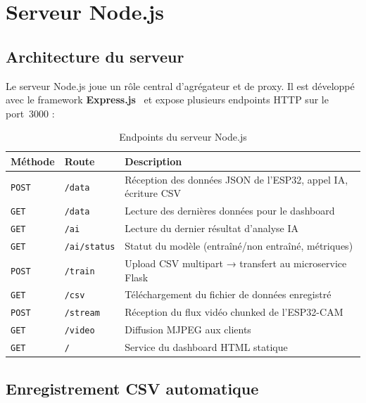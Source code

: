 \documentclass[12pt,a4paper]{report}
\newcommand{\code}[1]{\texttt{\small\colorbox{codebg}{#1}}}
\begin{document}
\chapter{Serveur Node.js}

\section{Architecture du serveur}

Le serveur Node.js joue un rôle central d'agrégateur et de proxy. Il est développé
avec le framework \textbf{Express.js}~\cite{nodejs_express} et expose plusieurs
endpoints HTTP sur le port~3000 :

\begin{table}[H]
\centering
\caption{Endpoints du serveur Node.js}
\label{tab:endpoints}
\begin{tabularx}{\textwidth}{@{}L{2cm}L{4cm}L{8cm}@{}}
\toprule
\textbf{Méthode} & \textbf{Route} & \textbf{Description} \\
\midrule
\code{POST} & \code{/data}      & Réception des données JSON de l'ESP32, appel IA, écriture CSV \\
\code{GET}  & \code{/data}      & Lecture des dernières données pour le dashboard \\
\code{GET}  & \code{/ai}        & Lecture du dernier résultat d'analyse IA \\
\code{GET}  & \code{/ai/status} & Statut du modèle (entraîné/non entraîné, métriques) \\
\code{POST} & \code{/train}     & Upload CSV multipart → transfert au microservice Flask \\
\code{GET}  & \code{/csv}       & Téléchargement du fichier de données enregistré \\
\code{POST} & \code{/stream}    & Réception du flux vidéo chunked de l'ESP32-CAM \\
\code{GET}  & \code{/video}     & Diffusion MJPEG aux clients \\
\code{GET}  & \code{/}          & Service du dashboard HTML statique \\
\bottomrule
\end{tabularx}
\end{table}

\section{Enregistrement CSV automatique}
\end{document}
